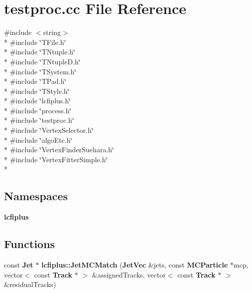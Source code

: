 \section{testproc.\-cc File Reference}
\label{testproc_8cc}
{\ttfamily \#include $<$string$>$}\\*
{\ttfamily \#include \char`\"{}T\-File.\-h\char`\"{}}\\*
{\ttfamily \#include \char`\"{}T\-Ntuple.\-h\char`\"{}}\\*
{\ttfamily \#include \char`\"{}T\-Ntuple\-D.\-h\char`\"{}}\\*
{\ttfamily \#include \char`\"{}T\-System.\-h\char`\"{}}\\*
{\ttfamily \#include \char`\"{}T\-Pad.\-h\char`\"{}}\\*
{\ttfamily \#include \char`\"{}T\-Style.\-h\char`\"{}}\\*
{\ttfamily \#include \char`\"{}lcfiplus.\-h\char`\"{}}\\*
{\ttfamily \#include \char`\"{}process.\-h\char`\"{}}\\*
{\ttfamily \#include \char`\"{}testproc.\-h\char`\"{}}\\*
{\ttfamily \#include \char`\"{}Vertex\-Selector.\-h\char`\"{}}\\*
{\ttfamily \#include \char`\"{}algo\-Etc.\-h\char`\"{}}\\*
{\ttfamily \#include \char`\"{}Vertex\-Finder\-Suehara.\-h\char`\"{}}\\*
{\ttfamily \#include \char`\"{}Vertex\-Fitter\-Simple.\-h\char`\"{}}\\*
\subsection*{Namespaces}
\begin{DoxyCompactItemize}
\item 
{\bf lcfiplus}
\end{DoxyCompactItemize}
\subsection*{Functions}
\begin{DoxyCompactItemize}
\item 
const {\bf Jet} $\ast$ {\bf lcfiplus\-::\-Jet\-M\-C\-Match} ({\bf Jet\-Vec} \&jets, const {\bf M\-C\-Particle} $\ast$mcp, vector$<$ const {\bf Track} $\ast$ $>$ \&assigned\-Tracks, vector$<$ const {\bf Track} $\ast$ $>$ \&residual\-Tracks)
\end{DoxyCompactItemize}
